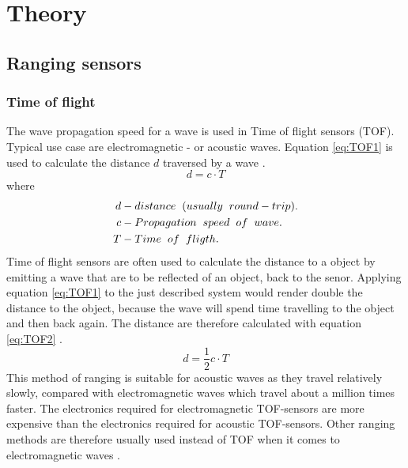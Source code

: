 \chapter{Theory}
\section{Ranging sensors}

\subsection{Time of flight}
The wave propagation speed for a wave is used in Time of flight sensors (TOF). Typical use case are electromagnetic - or acoustic waves. Equation \ref{eq:TOF1} is used to calculate the distance $d$ traversed by a wave \cite{introductionToMobileRobots}.
\begin{equation} \label{eq:TOF1}
    d = c \cdot T
\end{equation}
where 
\begin{align*} 
d   & - distance \hspace{2mm} (usually \hspace{2mm} round-trip).\\
c   & - Propagation \hspace{2mm} speed \hspace{2mm} of \hspace{2mm} wave. \\
T   & - Time \hspace{2mm} of \hspace{2mm} fligth. \\
\end{align*}  
Time of flight sensors are often used to calculate the distance to a object by emitting a wave that are to be reflected of an object, back to the senor. Applying equation \ref{eq:TOF1} to the just described system would render double the distance to the object, because the wave will spend time travelling to the object and then back again. The distance are therefore calculated with equation \ref{eq:TOF2} \cite{introductionToMobileRobots}.
\begin{equation} \label{eq:TOF2}
    d = \frac{1}{2}c \cdot T
\end{equation}
This method of ranging is suitable for acoustic waves as they travel relatively slowly, compared with electromagnetic waves which travel about a million times faster. The electronics required for electromagnetic TOF-sensors are more expensive than the electronics required for acoustic TOF-sensors. Other ranging methods are therefore usually used instead of TOF when it comes to electromagnetic waves \cite{introductionToMobileRobots}.

